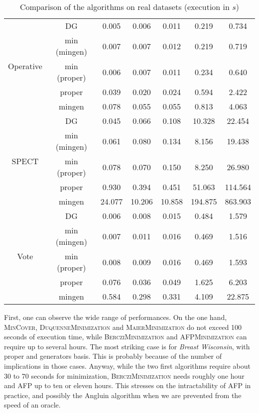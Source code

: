 \documentclass[runningheads]{llncs}
\begin{document}
\begin{table}
\begin{tabular}{| c | c || c | c | c | c | c |}
		\multirow{5}{*}{Operative} 
		& DG           & 0.005 & 0.006 & 0.011 & 0.219 & 0.734 \\
		& min (mingen) & 0.007 & 0.007 & 0.012 & 0.219 & 0.719 \\
		& min (proper) & 0.006 & 0.007 & 0.011 & 0.234 & 0.640 \\
		& proper       & 0.039 & 0.020 & 0.024 & 0.594 & 2.422 \\
		& mingen       & 0.078 & 0.055 & 0.055 & 0.813 & 4.063 \\ \hline
		
		\multirow{5}{*}{SPECT}
		& DG           & 0.045 & 0.066 & 0.108 & 10.328 & 22.454 \\
		& min (mingen) & 0.061 & 0.080 & 0.134 & 8.156 & 19.438 \\
		& min (proper) & 0.078 & 0.070 & 0.150 & 8.250 & 26.980 \\
		& proper       & 0.930 & 0.394 & 0.451 & 51.063 & 114.564 \\
		& mingen       & 24.077 & 10.206 & 10.858 & 194.875 & 863.903 \\ \hline
		
		\multirow{5}{*}{Vote}
		& DG           & 0.006 & 0.008 & 0.015 & 0.484 & 1.579 \\ 
		& min (mingen) & 0.007 & 0.011 & 0.016 & 0.469 & 1.516 \\
		& min (proper) & 0.008 & 0.009 & 0.016 & 0.469 & 1.593 \\
		& proper       & 0.076 & 0.036 & 0.049 & 1.625 & 6.203 \\
		& mingen       & 0.584 & 0.298 & 0.331 & 4.109 & 22.875 \\ \hline
		
		
	\end{tabular} 
	\caption{Comparison of the algorithms on real datasets (execution in $s$)}
	\label{tab:real-exe}
\end{table}

First, one can observe the wide range of performances. On the one hand,
\textsc{MinCover}, \textsc{DuquenneMinimization}  and \textsc{MaierMinimization} do not exceed 100 seconds of execution time, while \textsc{BercziMinimization} and \textsc{AFPMinimization} can require up to several hours. The most striking case is for \textit{Breast Wisconsin}, with proper and generators basis. This is probably because of the number of implications in those cases. Anyway, while the two first algorithms require about 30 to 70 seconds for minimization, \textsc{BercziMinimization} needs roughly one hour and \textsc{AFP} up to ten or eleven hours. This stresses on the intractability of \textsc{AFP} in practice, and possibly the Angluin algorithm when we are prevented from the speed of an oracle.
\end{document}
